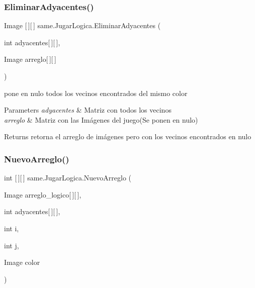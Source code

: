 \subsubsection{\texorpdfstring{Eliminar\+Adyacentes()}{EliminarAdyacentes()}}
{\footnotesize\ttfamily Image \mbox{[}$\,$\mbox{]}\mbox{[}$\,$\mbox{]} same.\+Jugar\+Logica.\+Eliminar\+Adyacentes (\begin{DoxyParamCaption}\item[{int}]{adyacentes\mbox{[}$\,$\mbox{]}\mbox{[}$\,$\mbox{]},  }\item[{Image}]{arreglo\mbox{[}$\,$\mbox{]}\mbox{[}$\,$\mbox{]} }\end{DoxyParamCaption})}

pone en nulo todos los vecinos encontrados del mismo color 
\begin{DoxyParams}{Parameters}
{\em adyacentes} & Matriz con todos los vecinos \\
\hline
{\em arreglo} & Matriz con las Imágenes del juego(\+Se ponen en nulo) \\
\hline
\end{DoxyParams}
\begin{DoxyReturn}{Returns}
retorna el arreglo de imágenes pero con los vecinos encontrados en nulo
\end{DoxyReturn}
\mbox{\label{classsame_1_1_jugar_logica_a021d188f57a9559187059e053aa2b951}} 
\subsubsection{\texorpdfstring{Nuevo\+Arreglo()}{NuevoArreglo()}}
{\footnotesize\ttfamily int \mbox{[}$\,$\mbox{]}\mbox{[}$\,$\mbox{]} same.\+Jugar\+Logica.\+Nuevo\+Arreglo (\begin{DoxyParamCaption}\item[{Image}]{arreglo\+\_\+logico\mbox{[}$\,$\mbox{]}\mbox{[}$\,$\mbox{]},  }\item[{int}]{adyacentes\mbox{[}$\,$\mbox{]}\mbox{[}$\,$\mbox{]},  }\item[{int}]{i,  }\item[{int}]{j,  }\item[{Image}]{color }\end{DoxyParamCaption})}


